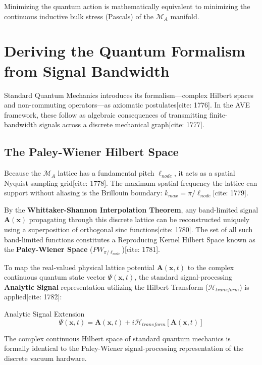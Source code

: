 Minimizing the quantum action is mathematically equivalent to minimizing the continuous
inductive bulk stress (Pascals) of the $\mathcal{M}_{A}$ manifold.

\section{Deriving the Quantum Formalism from Signal Bandwidth}
Standard Quantum Mechanics introduces its formalism---complex Hilbert spaces and non-commuting operators---as axiomatic postulates[cite: 1776]. In the AVE framework, these follow as algebraic consequences of transmitting finite-bandwidth signals across a discrete mechanical graph[cite: 1777].

\subsection{The Paley-Wiener Hilbert Space}
Because the $\mathcal{M}_A$ lattice has a fundamental pitch $\ell_{node}$, it acts as a spatial Nyquist sampling grid[cite: 1778]. The maximum spatial frequency the lattice can support without aliasing is the Brillouin boundary: $k_{max} = \pi / \ell_{node}$[cite: 1779].

By the \textbf{Whittaker-Shannon Interpolation Theorem}, any band-limited signal $\mathbf{A}(\mathbf{x})$ propagating through this discrete lattice can be reconstructed uniquely using a superposition of orthogonal sinc functions[cite: 1780]. The set of all such band-limited functions constitutes a Reproducing Kernel Hilbert Space known as the \textbf{Paley-Wiener Space} ($PW_{\pi/\ell_{node}}$)[cite: 1781].

To map the real-valued physical lattice potential $\mathbf{A}(\mathbf{x},t)$ to the complex continuous quantum state vector $\Psi(\mathbf{x},t)$, the standard signal-processing \textbf{Analytic Signal} representation utilizing the Hilbert Transform ($\mathcal{H}_{transform}$) is applied[cite: 1782]:
\begin{resultbox}{Analytic Signal Extension}
\begin{equation}
    \Psi(\mathbf{x},t) = \mathbf{A}(\mathbf{x},t) + i \mathcal{H}_{transform}[\mathbf{A}(\mathbf{x},t)]
\end{equation}
\end{resultbox}
The complex continuous Hilbert space of standard quantum mechanics is formally identical to the Paley-Wiener signal-processing representation of the discrete vacuum hardware.

